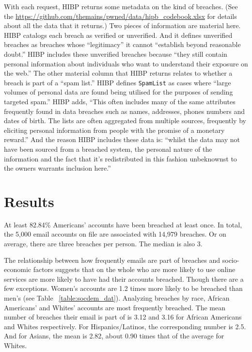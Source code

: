 \documentclass[12pt, letterpaper]{article}
\begin{document}
With each request, HIBP returns some metadata on the kind of breaches. (See the \href{codebook}{https://github.com/themains/pwned/data/hipb\_codebook.xlsx} for details about all the data that it returns.) Two pieces of information are material here. HIBP catalogs each breach as verified or unverified. And it defines unverified breaches as breaches whose ``legitimacy'' it cannot ``establish beyond reasonable doubt.'' HIBP includes these unverified breaches because ``they still contain personal information about individuals who want to understand their exposure on the web.'' The other material column that HIBP returns relates to whether a breach is part of a ``spam list.'' HIBP defines \texttt{SpamList} as cases where ``large volumes of personal data are found being utilised for the purposes of sending targeted spam.'' HIBP adds, ``This often includes many of the same attributes frequently found in data breaches such as names, addresses, phones numbers and dates of birth. The lists are often aggregated from multiple sources, frequently by eliciting personal information from people with the promise of a monetary reward.'' And the reason HIBP includes these data is: ``whilst the data may not have been sourced from a breached system, the personal nature of the information and the fact that it's redistributed in this fashion unbeknownst to the owners warrants inclusion here.''

\section*{Results}
At least 82.84\% Americans' accounts have been breached at least once. In total, the 5,000 email accounts on file are associated with 14,979 breaches. Or on average, there are three breaches per person. The median is also 3.

The relationship between how frequently emails are part of breaches and socio-economic factors suggests that on the whole who are more likely to use online services are more likely to have had their accounts breached. Though there are a few exceptions. 
Women's accounts are 1.2 times more likely to be breached than men's (see Table ~\ref{table:socdem_dat}). Analyzing breaches by race, African Americans' and Whites' accounts are most frequently breached. The mean number of breaches their email is part of is 3.12 and 3.16 for African Americans and Whites respectively. For Hispanics/Latinos, the corresponding number is 2.5. And for Asians, the mean is 2.82, about 0.90 times that of the average for Whites.
\end{document}
